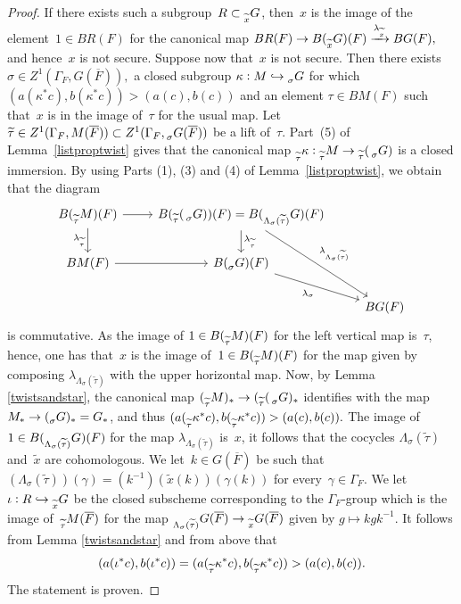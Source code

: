 \documentclass[a4paper,english,12pt]{amsart}
\newcommand{\oF}{\overline F}
\newcommand{\sG}{\prescript{}{\sigma}G}
\numberwithin{equation}{subsection}
\begin{document}
\begin{proof}
If there exists such a subgroup~$R\subset \prescript{}{\widetilde x}G$, then~$x$ is the image of the element~$1\in BR(F)$  for the canonical map $BR(F)\to B(\prescript{}{\widetilde x}G)(F)\xrightarrow{\lambda_{\widetilde x}}BG(F),$ and hence~$x$ is not secure. Suppose now that~$x$ is not secure. Then there exists $\sigma\in Z^1(\Gamma_F, G(\oF)),$  a closed subgroup $\kappa:M\hookrightarrow \prescript{}{\sigma}G$ for which $(a(\kappa^*c),b(\kappa^*c))>(a(c),b(c))$ and an element $\tau\in BM(F)$ such that~$x$ is in the image of~$\tau$ for the usual map. Let~$\widetilde\tau\in Z^1(\Gamma_F, M(\oF))\subset Z^1(\Gamma_F, \prescript{}{\sigma}G(\oF))$ be a lift of~$\tau$. Part~(5) of Lemma~\ref{listproptwist} gives that the canonical map $\prescript{}{\widetilde{\tau}}\kappa:\prescript{}{\widetilde \tau}M\to \prescript{}{\widetilde \tau}(\sG)$ is a closed immersion. By using Parts (1), (3) and (4) of Lemma~\ref{listproptwist}, we obtain that the diagram
\[\begin{tikzcd}
	{B(\prescript{}{\widetilde\tau}M)(F)} & {B(\prescript{}{\widetilde\tau}(\prescript{}{\sigma}G))(F)=B(\prescript{}{\Lambda_{\sigma}(\widetilde\tau)}G)(F)} \\
	{BM(F)} & {B(\sG)(F)} \\
	& {} & {BG(F)}
	\arrow[from=1-1, to=1-2]
	\arrow["{\lambda_{\widetilde{\tau}}}"', from=1-1, to=2-1]
	\arrow[from=2-1, to=2-2]
	\arrow["{\lambda_{\widetilde\tau}}", from=1-2, to=2-2]
	\arrow["{\lambda_{\sigma}}"', from=2-2, to=3-3]
	\arrow["{\lambda_{\Lambda_{\sigma}(\widetilde\tau)}}", from=1-2, to=3-3]
\end{tikzcd}\]
is commutative. As the image of $1\in B(\prescript{}{\widetilde\tau}M)(F)$ for the left vertical map is~$\tau$, hence, one has that~$x$ is the image of~$1\in B(\prescript{}{\widetilde\tau}M)(F)$ for the map given by composing $\lambda_{\Lambda_{\sigma}(\widetilde\tau)}$ with the upper horizontal map. Now, by Lemma \ref{twistsandstar}, the canonical map $(\prescript{}{\widetilde\tau}M)_{*}\to (\prescript{}{\widetilde\tau}(\sG)_{*}$ identifies with the map $M_{*}\to (\sG)_{*}=G_{*}$, and thus $ (a(\prescript{}{\widetilde\tau}\kappa^*c),b(\prescript{}{\widetilde\tau}\kappa^*c))>(a(c),b(c)).$ The image of $1\in B(\prescript{}{\Lambda_{\sigma}(\widetilde\tau)}G)(F)$ for the map $\lambda_{\Lambda_{\sigma}(\widetilde\tau)}$ is~$x$, it follows that the cocycles $\Lambda_{\sigma}(\widetilde\tau)$ and~$\widetilde x$ are cohomologous. We let~$k\in G(\oF)$ be such that $(\Lambda_{\sigma}(\widetilde\tau))(\gamma)=(k^{-1})(\widetilde x(k))(\gamma(k))$ for every~$\gamma\in \Gamma_F$. We let~$\iota:R\hookrightarrow \prescript{}{\widetilde x}G$ be the closed subscheme corresponding to the $\Gamma_F$-group which is the image of~$\prescript{}{\widetilde\tau}M(\oF)$ for the map $\prescript{}{\Lambda_{\sigma}(\widetilde\tau)}G(\oF)\to\prescript{}{\widetilde x}G(\oF)$ given by $g\mapsto kgk^{-1}.$ It follows from Lemma \ref{twistsandstar} and from above that $$(a(\iota^*c),b(\iota^*c))=(a(\prescript{}{\widetilde\tau}\kappa^*c),b(\prescript{}{\widetilde\tau}\kappa^*c))>(a(c),b(c)).$$The statement is proven. 
\end{proof}
\end{document}
